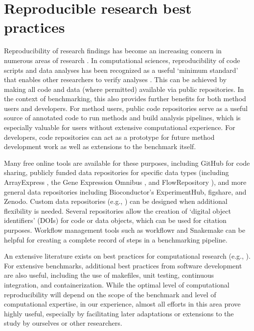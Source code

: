 \documentclass[12pt, a4paper]{article}
\begin{document}
\section*{Reproducible research best practices}

Reproducibility of research findings has become an increasing concern in numerous areas of research \citep{Ioannidis2005}. In computational sciences, reproducibility of code scripts and data analyses has been recognized as a useful `minimum standard' that enables other researchers to verify analyses \citep{Peng2011}. This can be achieved by making all code and data (where permitted) available via public repositories. In the context of benchmarking, this also provides further benefits for both method users and developers. For method users, public code repositories serve as a useful source of annotated code to run methods and build analysis pipelines, which is especially valuable for users without extensive computational experience. For developers, code repositories can act as a prototype for future method development work as well as extensions to the benchmark itself.

Many free online tools are available for these purposes, including GitHub for code sharing, publicly funded data repositories for specific data types (including ArrayExpress \citep{Kolesnikov2015}, the Gene Expression Omnibus \citep{Barrett2013}, and FlowRepository \citep{Spidlen2012}), and more general data repositories including Bioconductor's ExperimentHub, figshare, and Zenodo. Custom data repositories (e.g., \citep{Soneson2018, Soneson2016}) can be designed when additional flexibility is needed. Several repositories allow the creation of `digital object identifiers' (DOIs) for code or data objects, which can be used for citation purposes. Workflow management tools such as workflowr \cite{Blischak2018} and Snakemake \citep{Koster2012} can be helpful for creating a complete record of steps in a benchmarking pipeline.

An extensive literature exists on best practices for computational research (e.g., \citep{Sandve2013}). For extensive benchmarks, additional best practices from software development are also useful, including the use of makefiles, unit testing, continuous integration, and containerization. While the optimal level of computational reproducibility will depend on the scope of the benchmark and level of computational expertise, in our experience, almost all efforts in this area prove highly useful, especially by facilitating later adaptations or extensions to the study by ourselves or other researchers.
\end{document}
